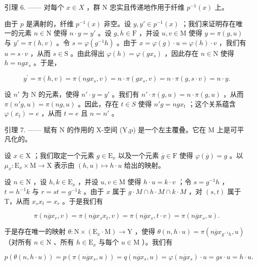 引理 6. —— 对每个 \(x \in X\) ，群 N 忠实且传递地作用于纤维 \(p^{-1}(x)\) 上。

由于 \(p\) 是满射的，纤维 \(p^{-1}(x)\) 非空。设 \(y, y' \in p^{-1}(x)\) ；我们来证明存在唯一的元素 \(n \in \mathrm{N}\) 使得 \(n \cdot y = y'\) 。设 \(g, h \in \mathrm{F}\) ，并设 \(u, v \in \mathrm{M}\) 使得 \(y = \pi(g, u)\) 与 \(y' = \pi(h, v)\) 。令 \(s = \varphi(g^{-1}h)\) 。由于 \(x = \varphi(g) \cdot u = \varphi(h) \cdot v\) ，我们有 \(u = s \cdot v\) ，从而 \(s \in \mathrm{S}\) 。由此得出 \(\varphi(h) = \varphi(gx_s)\) ，因此存在 \(n \in \mathrm{N}\) 使得 \(h = ngx_s\) 。于是，

\[
y ^ {\prime} = \pi (h, v) = \pi (n g x _ {s}, v) = n \cdot \pi (g x _ {s}, v) = n \cdot \pi (g, s \cdot v) = n \cdot y.
\]

设 \(n'\) 为 N 的元素，使得 \(n' \cdot y = y'\) 。我们有 \(n' \cdot \pi(g, u) = n \cdot \pi(g, u)\) ，从而 \(\pi(n'g, u) = \pi(ng, u)\) 。因此，存在 \(t \in S\) 使得 \(n'g = ngx_t\) ；这个关系蕴含 \(\varphi(x_t) = e\) ，从而 \(t = e\) 且 \(n = n'\) 。

引理 7. —— 赋有 N 的作用的 X-空间 (Y,p) 是一个左主覆叠。它在 M 上是可平凡化的。

设 \(x \in \mathrm{X}\) ；我们取定一个元素 \(g \in \mathrm{E}_x\) 以及一个元素 \(\overline{g} \in \mathrm{F}\) 使得 \(\varphi(\overline{g}) = g\) 。以 \(\mu_x \colon \mathrm{E}_x \times \mathrm{M} \to \mathrm{X}\) 表示由 \((h, u) \mapsto h \cdot u\) 给出的映射。

设 \(n \in \mathrm{N}\) ，设 \(h, k \in \mathrm{E}_x\) ，并设 \(u, v \in \mathrm{M}\) 使得 \(h \cdot u = k \cdot v\) ；令 \(s = g^{-1}h\) ，\(t = h^{-1}k\) 与 \(r = st = g^{-1}k\) 。由于 \(x\) 属于 \(g \cdot M \cap h \cdot M \cap k \cdot M\) ，对 \((s, t)\) 属于 T，从而 \(x_s x_t = x_r\) 。于是我们有

\[
\pi (n \overline {{g}} x _ {r}, v) = \pi (n \overline {{g}} x _ {s} x _ {t}, v) = \pi (n \overline {{g}} x _ {s}, t \cdot v) = \pi (n \overline {{g}} x _ {s}, u).
\]

于是存在唯一的映射 \(\theta\colon\mathrm{N}\times(\mathrm{E}_{x}\cdot\mathrm{M})\to\mathrm{Y}\) ，使得 \(\theta(n,h\cdot u)=\pi(n\overline{g}x_{g^{-1}h},u)\) （对所有 \(n\in\mathrm{N}\) 、所有 \(h\in\mathrm{E}_{x}\) 与每个 \(u\in\mathrm{M}\) ）。我们有

\[
p (\theta (n, h \cdot u)) = p (\pi (n \overline {{g}} x _ {s}, u)) = q (n \overline {{g}} x _ {s}, u) = \varphi (n \overline {{g}} x _ {s}) \cdot u = g s \cdot u = h \cdot u.
\]

